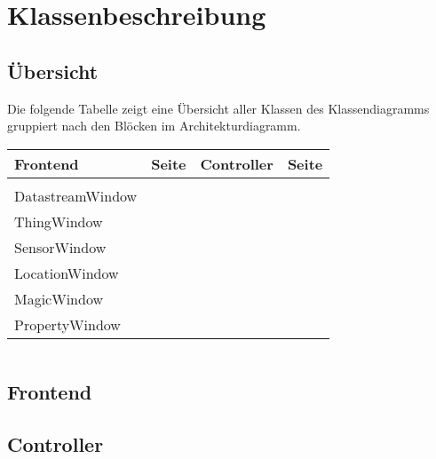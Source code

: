 \section{Klassenbeschreibung}
\subsection{Übersicht}
Die folgende Tabelle zeigt eine Übersicht aller Klassen des Klassendiagramms gruppiert nach den Blöcken im Architekturdiagramm.

\begin{table}[htbp]
\begin{tabular}{p{5cm} c | p{5cm} c}
Frontend & Seite & Controller & Seite\\
\hline
\nameref{MainWindow} & \pageref{MainWindow}\\
DatastreamWindow & \pageref{DatastreamWindow}\\
ThingWindow & \pageref{ThingWindow}\\
SensorWindow & \pageref{SensorWindow}\\
LocationWindow & \pageref{LocationWindow}\\
MagicWindow & \pageref{MagicWindow}\\
PropertyWindow & \pageref{PropertyWindow}

\end{tabular}
\begin{tabular}{p{8cm}}

\end{tabular}
\end{table}
\clearpage
\subsection{Frontend}


\subsection{Controller}














